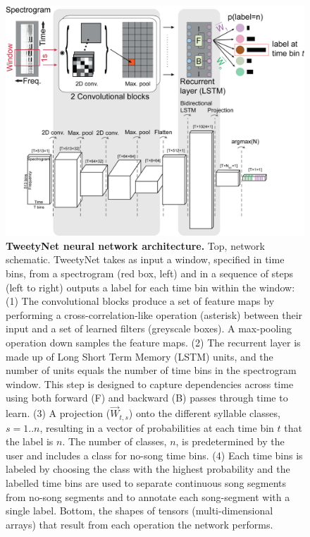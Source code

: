 \documentclass[10pt,letterpaper]{article}
\begin{document}
\begin{figure}[!ht]
\includegraphics[scale=0.5]{Figures/fig3/fig3_v2.png}
\caption{{\bf TweetyNet neural network architecture.}
Top, network schematic. TweetyNet takes as input a window, 
specified in time bins, from a spectrogram (red box, left) 
and in a sequence of steps (left to right) outputs a label for each time bin within the window:
(1) The convolutional blocks produce a set of feature maps 
by performing a cross-correlation-like operation (asterisk) 
between their input and a set of learned filters (greyscale boxes). 
A max-pooling operation down samples the feature maps.
(2) The recurrent layer is made up of Long Short Term Memory (LSTM) units, 
and the number of units equals the number of time bins in the spectrogram window. 
This step is designed to capture dependencies across time 
using both forward (F) and backward (B) passes through time to learn. 
(3) A projection ($\overrightarrow{W}_{t,s}$) onto the different syllable classes, $s=1..n$, 
resulting in a vector of probabilities at each time bin $t$ that the label is $n$. 
The number of classes, $n$, is predetermined by the user and includes a class for no-song time bins.
(4) Each time bins is labeled by choosing the class with the highest probability 
and the labelled time bins are used to separate continuous song segments 
from no-song segments and to annotate each song-segment with a single label.
Bottom, the shapes of tensors (multi-dimensional arrays) that result from each operation the network performs.}
\label{fig3}
\end{figure}
\end{document}
